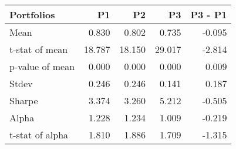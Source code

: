 \begin{tabular}{lrrrr}
\toprule
Portfolios & P1 & P2 & P3 & P3 - P1 \\
\midrule
Mean & 0.830 & 0.802 & 0.735 & -0.095 \\
t-stat of mean & 18.787 & 18.150 & 29.017 & -2.814 \\
p-value of mean & 0.000 & 0.000 & 0.000 & 0.009 \\
Stdev & 0.246 & 0.246 & 0.141 & 0.187 \\
Sharpe & 3.374 & 3.260 & 5.212 & -0.505 \\
Alpha & 1.228 & 1.234 & 1.009 & -0.219 \\
t-stat of alpha & 1.810 & 1.886 & 1.709 & -1.315 \\
\bottomrule
\end{tabular}
